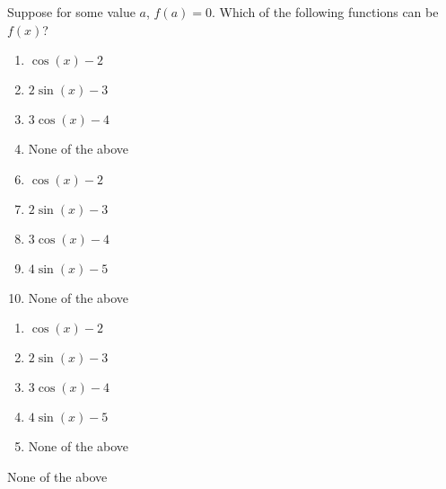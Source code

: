 

  Suppose for some value $a$, $f(a)=0$.  Which of the following functions can be $f(x)$?  



\ifsat
	\begin{enumerate}[label=\Alph*)]
		\item    $\cos(x)-2$
		\item  $2\sin(x)-3$ 
		\item $3\cos(x)-4$
		\item  None of the above %
	\end{enumerate}
\else
\fi

\ifacteven
	\begin{enumerate}[label=\textbf{\Alph*.},itemsep=\fill,align=left]
		\setcounter{enumii}{5}
		\item    $\cos(x)-2$
		\item  $2\sin(x)-3$ 
		\item $3\cos(x)-4$
		\addtocounter{enumii}{1}
		\item  $4\sin(x)-5$
		\item  None of the above %
	\end{enumerate}
\else
\fi

\ifactodd
	\begin{enumerate}[label=\textbf{\Alph*.},itemsep=\fill,align=left]
		\item    $\cos(x)-2$
		\item  $2\sin(x)-3$ 
		\item $3\cos(x)-4$
		\item  $4\sin(x)-5$
		\item  None of the above %
	\end{enumerate}
\else
\fi

\ifgridin
  None of the above %

\else
\fi

